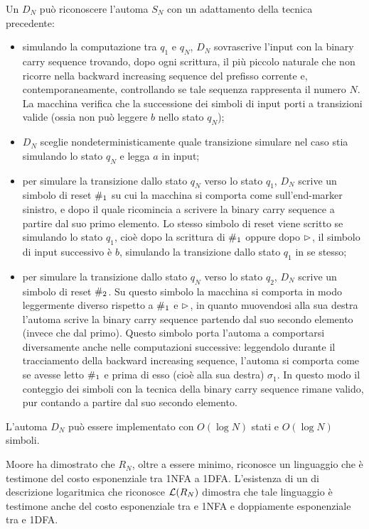 Un  $D_N$ può riconoscere l'automa $S_N$ con un adattamento della tecnica precedente:
\begin{itemize}
	\item simulando la computazione tra $q_1$ e $q_N$, $D_N$ sovrascrive l'input con la binary carry sequence trovando, dopo ogni scrittura, il più piccolo naturale che non ricorre nella backward increasing sequence del prefisso corrente e, contemporaneamente, controllando se tale sequenza rappresenta il numero $N$. La macchina verifica che la successione dei simboli di input porti a transizioni valide (ossia non può leggere $b$ nello stato $q_N$);
	\item $D_N$ sceglie nondeterministicamente quale transizione simulare nel caso stia simulando lo stato $q_N$ e legga $a$ in input;
	\item per simulare la transizione dallo stato $q_N$ verso lo stato $q_1$, $D_N$ scrive un simbolo di reset $\#_1$ su cui la macchina si comporta come sull'end-marker sinistro, e dopo il quale ricomincia a scrivere la binary carry sequence a partire dal suo primo elemento. Lo stesso simbolo di reset viene scritto se simulando lo stato $q_1$, cioè dopo la scrittura di $\#_1$ oppure dopo $\rhd$, il simbolo di input successivo è $b$, simulando la transizione dallo stato $q_1$ in se stesso;
	\item per simulare la transizione dallo stato $q_N$ verso lo stato $q_2$, $D_N$ scrive un simbolo di reset $\#_2$. Su questo simbolo la macchina si comporta in modo leggermente diverso rispetto a $\#_1$ e $\rhd$, in quanto muovendosi alla sua destra l'automa scrive la binary carry sequence partendo dal suo secondo elemento (invece che dal primo). Questo simbolo porta l'automa a comportarsi diversamente anche nelle computazioni successive: leggendolo durante il tracciamento della backward increasing sequence, l'automa si comporta come se avesse letto $\#_1$ e prima di esso (cioè alla sua destra) $\sigma_1$. In questo modo il conteggio dei simboli con la tecnica della binary carry sequence rimane valido, pur contando a partire dal suo secondo elemento.
\end{itemize}
L'automa $D_N$ può essere implementato con $O(\log N)$ stati e $O(\log N)$ simboli.

Moore ha dimostrato che $R_N$, oltre a essere minimo, riconosce un linguaggio che è testimone del costo esponenziale tra 1NFA a 1DFA. L'esistenza di un  di descrizione logaritmica che riconosce $\mathcal L(R_N)$ dimostra che tale linguaggio è testimone anche del costo esponenziale tra  e 1NFA e doppiamente esponenziale tra  e 1DFA.

